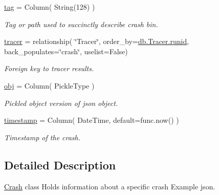 \begin{DoxyCompactItemize}
\mbox{\label{classdb_1_1crash_1_1_crash_abd980f257c8c41c76ed0ae2e7a7a6c9d}} 
\mbox{\hyperlink{classdb_1_1crash_1_1_crash_abd980f257c8c41c76ed0ae2e7a7a6c9d}{tag}} = Column( String(128) )
\begin{DoxyCompactList}\small\item\em Tag or path used to succinctly describe crash bin. \end{DoxyCompactList}\item 
\mbox{\label{classdb_1_1crash_1_1_crash_aedb46d76edc2c2f68a918506fbf05f07}} 
\mbox{\hyperlink{classdb_1_1crash_1_1_crash_aedb46d76edc2c2f68a918506fbf05f07}{tracer}} = relationship( \char`\"{}Tracer\char`\"{}, order\+\_\+by=\mbox{\hyperlink{classdb_1_1tracer_1_1_tracer_ad3aa7209ddeb56fbe3fc6b45c3b5fe79}{db.\+Tracer.\+runid}}, back\+\_\+populates=\char`\"{}crash\char`\"{}, uselist=False)
\begin{DoxyCompactList}\small\item\em Foreign key to tracer results. \end{DoxyCompactList}\item 
\mbox{\hyperlink{classdb_1_1crash_1_1_crash_a6a80e1de8e0385b11a41f4d9a02c04d3}{obj}} = Column( Pickle\+Type )
\begin{DoxyCompactList}\small\item\em Pickled object version of json object. \end{DoxyCompactList}\item 
\mbox{\label{classdb_1_1crash_1_1_crash_a01995e254a515cb4b3d51d15ffef6c33}} 
\mbox{\hyperlink{classdb_1_1crash_1_1_crash_a01995e254a515cb4b3d51d15ffef6c33}{timestamp}} = Column( Date\+Time, default=func.\+now() )
\begin{DoxyCompactList}\small\item\em Timestamp of the crash. \end{DoxyCompactList}\end{DoxyCompactItemize}


\subsection{Detailed Description}
\mbox{\hyperlink{classdb_1_1crash_1_1_crash}{Crash}} class Holds information about a specific crash Example json. 


